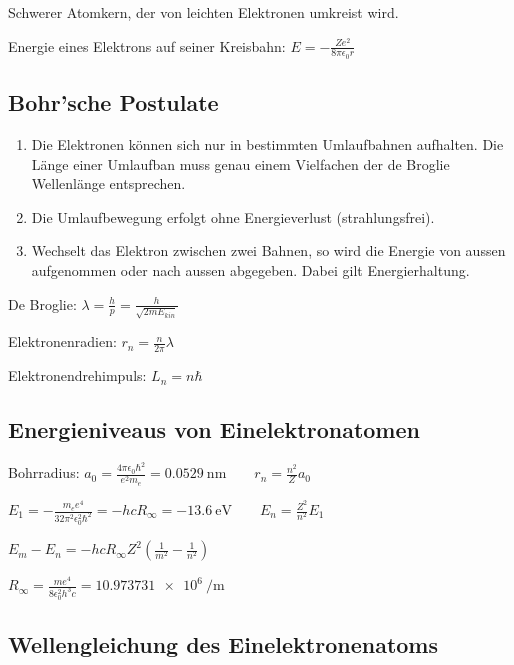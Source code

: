 \documentclass[10pt,a4paper]{scrartcl}
\begin{document}
\begin{multicols*}{3}
	Schwerer Atomkern, der von leichten Elektronen umkreist wird.
	
	Energie eines Elektrons auf seiner Kreisbahn: $E = -\frac{Ze^2}{8\pi\epsilon_0r}$
	
	
	\subsection*{Bohr'sche Postulate}
	
	\begin{enumerate}
	\item
	Die Elektronen können sich nur in bestimmten Umlaufbahnen aufhalten. Die Länge einer Umlaufban muss genau einem Vielfachen der de Broglie Wellenlänge entsprechen.
	\item
	Die Umlaufbewegung erfolgt ohne Energieverlust (strahlungsfrei).
	\item
	Wechselt das Elektron zwischen zwei Bahnen, so wird die Energie von aussen aufgenommen oder nach aussen abgegeben. Dabei gilt Energierhaltung.
	\end{enumerate}
	
	De Broglie: $\lambda = \frac{h}{p}=\frac{h}{\sqrt{2mE_{kin}}}$
	
	Elektronenradien: $r_n=\frac{n}{2\pi}\lambda$
	
	Elektronendrehimpuls: $L_n=n\hbar$
	
	\subsection{Energieniveaus von Einelektronatomen}
	
	Bohrradius: $a_0=\frac{4\pi \epsilon_0\hbar^2}{e^2m_e}=\SI{0.0529}{\nano\meter}\qquad r_n=\frac{n^2}{Z}a_0$
	
	$E_1 = -\frac{m_ee^4}{32\pi^2\epsilon_0^2\hbar^2}=-hcR_\infty=\SI{-13.6}{\electronvolt}\qquad E_n=\frac{Z^2}{n^2}E_1$
	
	
	\finn
	
	$E_m-E_n=-hcR_{\infty}Z^2\left(\frac{1}{m^2}-\frac{1}{n^2}\right)$\hfill {}
	
	$R_{\infty}=\frac{me^4}{8\epsilon_0^2h^3c}=\SI{10.973731e6}{\per\meter}$
	
	
	\subsection{Wellengleichung des Einelektronenatoms}
	

\end{multicols*}
\end{document}
